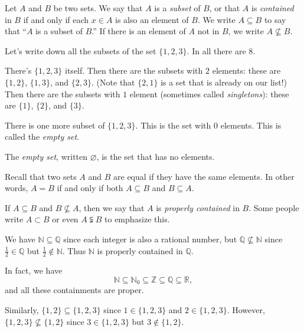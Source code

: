 \documentclass[11pt,dvipsnames]{book}
\numberwithin{figure}{section} %
\numberwithin{table}{section} %
\begin{document}
\begin{definition}
Let $A$ and $B$ be two sets.
We say that $A$ is a {\it subset} of $B$, or that $A$ is {\it contained} in $B$ if and only if each $x\in A$ is also an element of $B$.
We write $A \subseteq B$ to say that ``$A$ is a subset of $B$.''
If there is an element of $A$ not in $B$, we write $A\not\subseteq B$.
\end{definition}

\begin{example}
Let's write down all the subsets of the set $\{1,2,3\}$.
In all there are $8$.

There's $\{1,2,3\}$ itself.
Then there are the subsets with $2$ elements: these are $\{1,2\}$, $\{1,3\}$, and $\{2,3\}$.
(Note that $\{2,1\}$ is a set that is already on our list!)
Then there are the subsets with $1$ element (sometimes called \emph{singletons}): these are $\{1\}$, $\{2\}$, and $\{3\}$.

There is one more subset of $\{1,2,3\}$.
This is the set with $0$ elements.
This is called the \emph{empty set}.
\end{example}

\begin{definition}
The \emph{empty set}, written $\varnothing$, is the set that has no elements.
\end{definition}

\begin{example}
Recall that two sets $A$ and $B$ are equal if they have the same elements.
In other words, $A=B$ if and only if both $A \subseteq B$ and $B \subseteq A$.
\end{example}

If $A \subseteq B$ and $B \not\subseteq A$, then we say that $A$ is \emph{properly contained} in $B$.
Some people write $A \subset B$ or even $A \subsetneqq B$ to emphasize this.

\begin{example}
We have $\mathbb{N}\subseteq \mathbb{Q}$ since each integer is also a rational number, but $\mathbb{Q}\not\subseteq \mathbb{N}$ since $\frac{1}{2}\in \mathbb{Q}$ but $\frac{1}{2}\not\in \mathbb{N}$.
Thus $\mathbb{N}$ is properly contained in $\mathbb{Q}$.

In fact, we have
\[
\mathbb{N} \subseteq \mathbb{N}_0 \subseteq \mathbb{Z} \subseteq \mathbb{Q} \subseteq \mathbb{R},
\]
and all these containments are proper.
 
Similarly, $\{1,2\}\subseteq \{1,2,3\}$ since $1\in \{1,2,3\}$ and $2\in \{1,2,3\}$. However, $\{1,2,3\}\not\subseteq \{1,2\}$  since $3\in \{1,2,3\}$ but $3\not\in \{1,2\}$.
\end{example}
\end{document}
